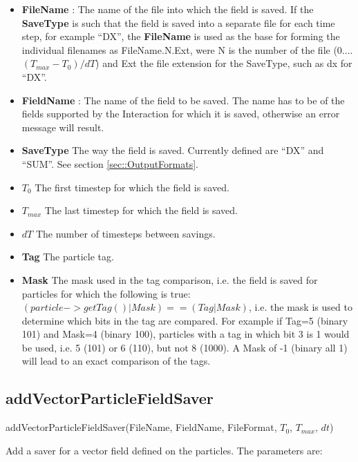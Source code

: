 \documentclass{report}
\begin{document}
\begin{itemize}
\item \textbf{FileName} : The name of the file into which the field is saved. If the  \textbf{SaveType} is such that the field is saved into a separate file for each time step, for example ``DX'', the \textbf{FileName} is used as the base for forming the individual filenames as FileName.N.Ext, were N is the number of the file (0....$(T_{max}-T_0)/dT$) and Ext the file extension for the SaveType, such as dx for ``DX''.
\item \textbf{FieldName} : The name of the field to be saved. The name has to be of the fields supported by the Interaction for which it is saved, otherwise an error message will result.
\item \textbf{SaveType} The way the field is saved. Currently defined are ``DX'' and ``SUM''. See section \ref{sec::OutputFormats}.
\item \textbf{$T_0$} The first timestep for which the field is saved.
\item \textbf{$T_{max}$} The last timestep for which the field is saved.
\item \textbf{$dT$} The number of timesteps between savings. 
\item \textbf{Tag} The particle tag.
\item \textbf{Mask} The mask used in the tag comparison, i.e. the field is saved for particles for which the following is true: $(particle->getTag() | Mask ) == (Tag | Mask)$, i.e. the mask is used to determine which bits in the tag are compared. For example if Tag=5 (binary 101) and Mask=4 (binary 100), particles with a tag in which bit 3 is 1 would be used, i.e. 5 (101) or 6 (110), but not 8 (1000). A Mask of -1 (binary all 1) will lead to an exact comparison of the tags.     
\end{itemize}

\subsection{addVectorParticleFieldSaver}

\textsf{addVectorParticleFieldSaver(FileName, FieldName, FileFormat, $T_0$, $T_{max}$, $dt$)}
\par \medskip

Add a saver for a vector field defined on the particles. The parameters are:
\end{document}
